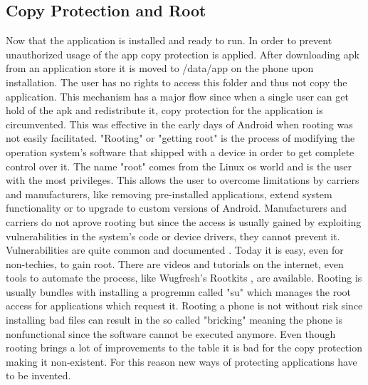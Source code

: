 \subsection{Copy Protection and Root} \label{subsection:android-copyroot}
Now that the application is installed and ready to run.
In order to prevent unauthorized usage of the app copy protection is applied.
After downloading \gls{apk} from an application store it is moved to /data/app on the phone upon installation.
The user has no rights to access this folder and thus not copy the application.
This mechanism has a major flow since when a single user can get hold of the \gls{apk} and redistribute it, copy protection for the application is circumvented.
This was effective in the early days of Android when rooting was not easily facilitated.
\newline
"Rooting" or "getting root" is the process of modifying the operation system's software that shipped with a device in order to get complete control over it.
The name "root" comes from the Linux \gls{os} world and is the user with the most privileges.
This allows the user to overcome limitations by carriers and manufacturers, like removing pre-installed applications, extend system functionality or to upgrade to custom versions of Android.
Manufacturers and carriers do not aprove rooting but since the access is usually gained by exploiting vulnerabilities in the system's code or device drivers, they cannot prevent it.
Vulnerabilities are quite common and documented \cite{androidVulnerabilities}.
Today it is easy, even for non-techies, to gain root.
There are videos and tutorials on the internet, even tools to automate the process, like Wugfresh's Rootkits \cite{wugfresh}, are available.
Rooting is usually bundles with installing a progremm called "su" which manages the root access for applications which request it.
Rooting a phone is not without risk since installing bad files can result in the so called "bricking" meaning the phone is nonfunctional since the software cannot be executed anymore.\cite{androidpoliceRoot}
\newline
Even though rooting brings a lot of improvements to the table it is bad for the copy protection making it non-existent. For this reason new ways of protecting applications have to be invented.
